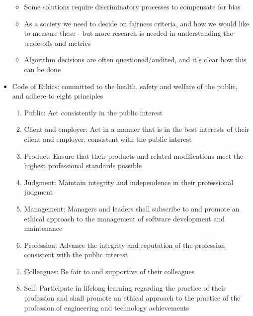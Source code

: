 \documentclass[12pt,openany]{book}
\begin{document}
\begin{itemize}
\begin{itemize}
        \item Some solutions require discriminatory processes to compensate for bias
        \item As a society we need to decide on fairness criteria, and how we would like to measure these - but more research is needed in understanding the trade-offs and metrics
        \item Algorithm decisions are often questioned/audited, and it’s clear how this can be done
    \end{itemize}
    \item Code of Ethics: committed to the health, safety and welfare of the public, and adhere to eight principles
    \begin{enumerate}
        \item Public: Act consistently in the public interest
        \item Client and employer: Act in a manner that is in the best interests of their client and employer, consistent with the public interest
        \item Product: Ensure that their products and related modifications meet the highest professional standards possible
        \item Judgment: Maintain integrity and independence in their professional judgment
        \item Management: Managers and leaders shall subscribe to and promote an ethical approach to the management of software development and maintenance
        \item Profession: Advance the integrity and reputation of the profession consistent with the public interest
        \item Colleagues: Be fair to and supportive of their colleagues
        \item Self: Participate in lifelong learning regarding the practice of their profession and shall promote an ethical approach to the practice of the profession.of engineering and technology achievements
    \end{enumerate}
\end{itemize}
\end{document}
